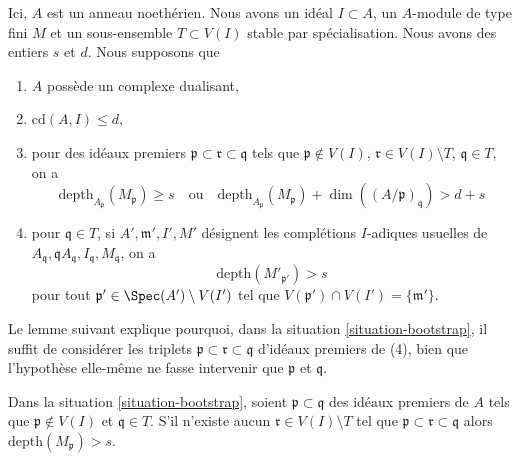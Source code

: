 \begin{situation}
\label{situation-bootstrap}
Ici, $A$ est un anneau noethérien. Nous avons un idéal $I \subset A$,
un $A$-module de type fini $M$ et un sous-ensemble $T \subset V(I)$ stable par
spécialisation. Nous avons des entiers $s$ et $d$. Nous supposons que
\begin{enumerate}
\item[(1)] $A$ possède un complexe dualisant,
\item[(3)] $\text{cd}(A, I) \leq d$,
\item[(4)] pour des idéaux premiers $\mathfrak p \subset \mathfrak r \subset \mathfrak q$
tels que $\mathfrak p \not \in V(I)$,
$\mathfrak r \in V(I) \setminus T$,
$\mathfrak q \in T$, on a
$$
\text{depth}_{A_\mathfrak p}(M_\mathfrak p) \geq s
\quad\text{ou}\quad
\text{depth}_{A_\mathfrak p}(M_\mathfrak p) +
\dim((A/\mathfrak p)_\mathfrak q) > d + s
$$
\item[(6)] pour $\mathfrak q \in T$, si
$A', \mathfrak m', I', M'$ désignent les complétions $I$-adiques usuelles
de $A_\mathfrak q, \mathfrak qA_\mathfrak q, I_\mathfrak q, M_\mathfrak q$,
on a
$$
\text{depth}(M'_{\mathfrak p'}) > s
$$
pour tout $\mathfrak p' \in \Spec(A') \setminus V(I')$ tel que
$V(\mathfrak p') \cap V(I') = \{\mathfrak m'\}$.
\end{enumerate}
\end{situation}

\noindent
Le lemme suivant explique pourquoi, dans la situation \ref{situation-bootstrap},
il suffit de considérer les triplets
$\mathfrak p \subset \mathfrak r \subset \mathfrak q$ d'idéaux premiers de (4),
bien que l'hypothèse elle-même ne fasse intervenir que $\mathfrak p$ et $\mathfrak q$.

\begin{lemma}
\label{lemma-helper-bootstrap}
Dans la situation \ref{situation-bootstrap}, soient $\mathfrak p \subset \mathfrak q$
des idéaux premiers de $A$ tels que $\mathfrak p \not \in V(I)$ et
$\mathfrak q \in T$. S'il n'existe aucun
$\mathfrak r \in V(I) \setminus T$ tel que
$\mathfrak p \subset \mathfrak r \subset \mathfrak q$
alors $\text{depth}(M_\mathfrak p) > s$.
\end{lemma}


